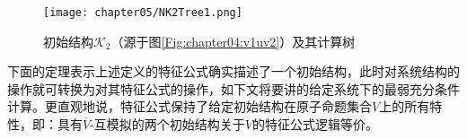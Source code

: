 \begin{example}
	
	
	\begin{figure*}
		\centering
		\texttt{[image: chapter05/NK2Tree1.png]}
		\caption{初始结构$\mathcal{K}_2$（源于图\ref{Fig:chapter04:v1uv2}）及其计算树}\label{fig:K2Tree}
	\end{figure*}


\end{example}


下面的定理表示上述定义的特征公式确实描述了一个初始结构，此时对系统结构的操作就可转换为对其特征公式的操作，如下文将要讲的给定系统下的最弱充分条件计算。更直观地说，特征公式保持了给定初始结构在原子命题集合$V$上的所有特性，即：具有$\overline{V}$-互模拟的两个初始结构关于$V$的特征公式逻辑等价。


